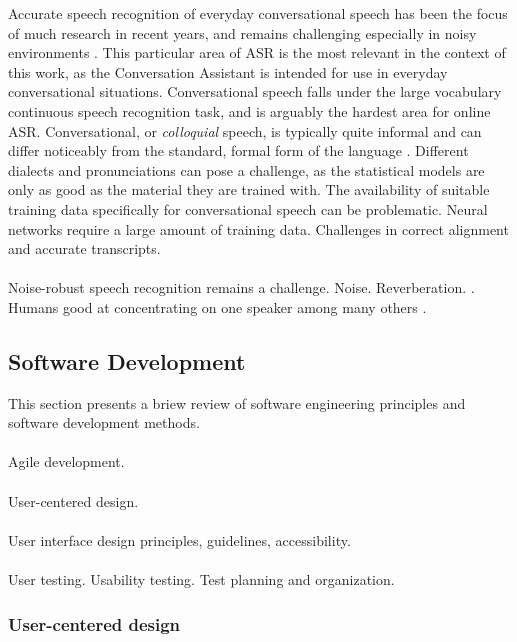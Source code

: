 \documentclass[english, 12pt, a4paper, pdftex, elec, utf8]{aaltothesis}
\begin{document}
Accurate speech recognition of everyday conversational speech has been the focus of much research in recent years, and remains challenging especially in noisy environments \cite{keronen2014approaching, kallasjoki2016, xiong2016achieving, li2014overview, keronen2010comparison, pylkkonen2013towards}. This particular area of ASR is the most relevant in the context of this work, as the Conversation Assistant is intended for use in everyday conversational situations. Conversational speech falls under the large vocabulary continuous speech recognition task, and is arguably the hardest area for online ASR. Conversational, or \textit{colloquial} speech, is typically quite informal and can differ noticeably from the standard, formal form of the language \cite{enarvi2017automatic}. Different dialects and pronunciations can pose a challenge, as the statistical models are only as good as the material they are trained with. The availability of suitable training data specifically for conversational speech can be problematic. Neural networks require a large amount of training data. Challenges in correct alignment and accurate transcripts. \\\\
Noise-robust speech recognition remains a challenge. Noise. Reverberation. \cite{kallasjoki2016, keronen2010comparison, keronen2014approaching, pohjalainen2009weighted, li2014overview}. Humans good at concentrating on one speaker among many others \cite{bronkhorst2000cocktail}.

\subsection{Software Development} \label{subsec:soft}

This section presents a briew review of software engineering principles and software development methods. \\\\
Agile development. \\\\
User-centered design. \\\\
User interface design principles, guidelines, accessibility. \\\\
User testing. Usability testing. Test planning and organization.

\subsubsection{User-centered design}
\end{document}
